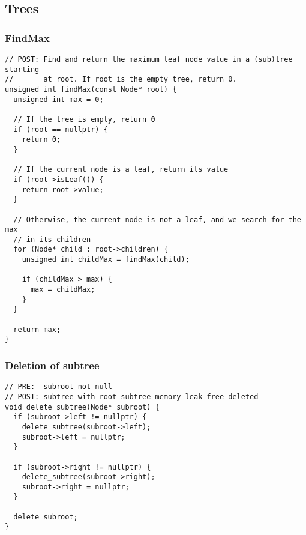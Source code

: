 \subsection{Trees}
\subsubsection{FindMax}
\begin{lstlisting}[style = codeexpert]
// POST: Find and return the maximum leaf node value in a (sub)tree starting 
//       at root. If root is the empty tree, return 0.
unsigned int findMax(const Node* root) {
  unsigned int max = 0;
  
  // If the tree is empty, return 0
  if (root == nullptr) {
    return 0;
  }
  
  // If the current node is a leaf, return its value
  if (root->isLeaf()) {
    return root->value;
  }
  
  // Otherwise, the current node is not a leaf, and we search for the max 
  // in its children
  for (Node* child : root->children) {
    unsigned int childMax = findMax(child);
    
    if (childMax > max) {
      max = childMax;
    }
  }
  
  return max;
}
\end{lstlisting}

\subsubsection{Deletion of subtree}
\begin{lstlisting}[style = codeexpert]
// PRE:  subroot not null
// POST: subtree with root subtree memory leak free deleted
void delete_subtree(Node* subroot) {
  if (subroot->left != nullptr) {
    delete_subtree(subroot->left);
    subroot->left = nullptr;
  }
  
  if (subroot->right != nullptr) {
    delete_subtree(subroot->right);
    subroot->right = nullptr;
  }
  
  delete subroot;
}
\end{lstlisting}

